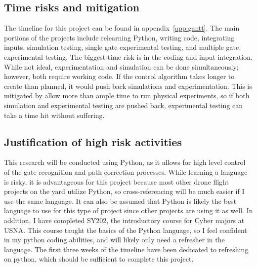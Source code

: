 \documentclass[onecolumn,10pt]{IEEEtran}
\begin{document}



\subsection{Time risks and mitigation}
The timeline for this project can be found in appendix~\ref{app:gantt}. The main portions of the projects include relearning Python, writing code, integrating inputs, simulation testing, single gate experimental testing, and multiple gate experimental testing. The biggest time risk is in the coding and input integration. While not ideal, experimentation and simulation can be done simultaneously; however, both require working code. If the control algorithm takes longer to create than planned, it would push back simulations and experimentation. This is mitigated by allow more than ample time to run physical experiments, so if both simulation and experimental testing are pushed back, experimental testing can take a time hit without suffering.



\subsection{Justification of high risk activities}
This research will be conducted using Python, as it allows for high level control of the gate recognition and path correction processes. While learning a language is risky, it is advantageous for this project because most other drone flight projects on the yard utilize Python, so cross-referencing will be much easier if I use the same language. It can also be assumed that Python is likely the best language to use for this type of project since other projects are using it as well. In addition, I have completed SY202, the introductory course for Cyber majors at USNA. This course taught the basics of the Python language, so I feel confident in my python coding abilities, and will likely only need a refresher in the language. The first three weeks of the timeline have been dedicated to refreshing on python, which should be sufficient to complete this project.
\end{document}
